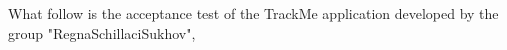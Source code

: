\documentclass[../main.tex]{subfiles}
\begin{document}
    What follow is the acceptance test of the TrackMe application developed
    by the group "RegnaSchillaciSukhov",  
    
\end{document}
